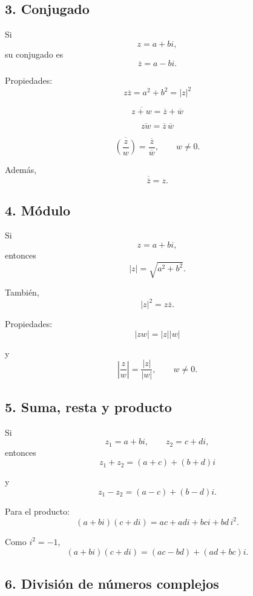 \documentclass[12pt]{article}
\begin{document}
\subsection*{3. Conjugado}

Si
\[
z=a+bi,
\]
su conjugado es
\[
\boxed{\overline z=a-bi}.
\]

Propiedades:
\[
\boxed{z\overline z=a^2+b^2=|z|^2}
\]

\[
\boxed{\overline{z+w}=\overline z+\overline w}
\]

\[
\boxed{\overline{zw}=\overline z\,\overline w}
\]

\[
\boxed{
\overline{\left(\frac zw\right)}
=
\frac{\overline z}{\overline w}
},
\qquad w\neq0.
\]

Además,
\[
\boxed{\overline{\overline z}=z}.
\]

\subsection*{4. Módulo}

Si
\[
z=a+bi,
\]
entonces
\[
\boxed{|z|=\sqrt{a^2+b^2}}.
\]

También,
\[
\boxed{|z|^2=z\overline z}.
\]

Propiedades:
\[
\boxed{|zw|=|z||w|}
\]

y
\[
\boxed{
\left|\frac zw\right|
=
\frac{|z|}{|w|}
},
\qquad w\neq0.
\]

\subsection*{5. Suma, resta y producto}

Si
\[
z_1=a+bi,
\qquad
z_2=c+di,
\]
entonces
\[
\boxed{
z_1+z_2=(a+c)+(b+d)i
}
\]

y
\[
\boxed{
z_1-z_2=(a-c)+(b-d)i.
}
\]

Para el producto:
\[
(a+bi)(c+di)
=
ac+adi+bci+bd\,i^2.
\]

Como $i^2=-1$,
\[
\boxed{
(a+bi)(c+di)
=
(ac-bd)+(ad+bc)i.
}
\]

\subsection*{6. División de números complejos}
\end{document}

